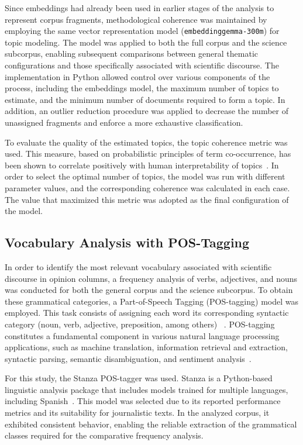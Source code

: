 \documentclass[pdflatex,sn-mathphys-num, iicol]{sn-jnl}
\begin{document}
	
	
	Since embeddings had already been used in earlier stages of the analysis to represent corpus fragments, methodological coherence was maintained by employing the same vector representation model (\texttt{embeddinggemma-300m}) for topic modeling. The model was applied to both the full corpus and the science subcorpus, enabling subsequent comparisons between general thematic configurations and those specifically associated with scientific discourse. The implementation in Python allowed control over various components of the process, including the embeddings model, the maximum number of topics to estimate, and the minimum number of documents required to form a topic. In addition, an outlier reduction procedure was applied to decrease the number of unassigned fragments and enforce a more exhaustive classification.
	
	To evaluate the quality of the estimated topics, the topic coherence metric was used. This measure, based on probabilistic principles of term co-occurrence, has been shown to correlate positively with human interpretability of topics~\cite{Rder2015}. In order to select the optimal number of topics, the model was run with different parameter values, and the corresponding coherence was calculated in each case. The value that maximized this metric was adopted as the final configuration of the model.

	
	\subsection{Vocabulary Analysis with POS-Tagging}\label{subsec:pos}
	
	In order to identify the most relevant vocabulary associated with scientific discourse in opinion columns, a frequency analysis of verbs, adjectives, and nouns was conducted for both the general corpus and the science subcorpus. To obtain these grammatical categories, a Part-of-Speech Tagging (POS-tagging) model was employed. This task consists of assigning each word its corresponding syntactic category (noun, verb, adjective, preposition, among others) ~\cite{he2020surveyrecentadvancessequence}. POS-tagging constitutes a fundamental component in various natural language processing applications, such as machine translation, information retrieval and extraction, syntactic parsing, semantic disambiguation, and sentiment analysis~\cite{Chiche2022}.
	
	For this study, the Stanza POS-tagger was used. Stanza is a Python-based linguistic analysis package that includes models trained for multiple languages, including Spanish~\cite{qi2020stanza}. This model was selected due to its reported performance metrics and its suitability for journalistic texts. In the analyzed corpus, it exhibited consistent behavior, enabling the reliable extraction of the grammatical classes required for the comparative frequency analysis.
	
\end{document}
